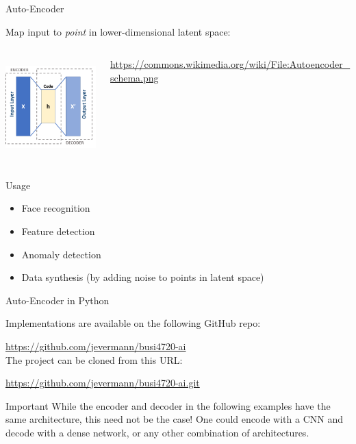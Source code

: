\documentclass[ignorenonframetext,xcolor=x11names]{beamer}
\begin{document}
\begin{frame}{Auto-Encoder}

Map input to \emph{point} in lower-dimensional latent space:

\begin{columns}
\begin{column}{.5\textwidth}
\begin{center}
\includegraphics[height=1.5in]{Autoencoder_schema.png}
\end{center}
\end{column}
\begin{column}{.4\textwidth}
\scriptsize \url{https://commons.wikimedia.org/wiki/File:Autoencoder_schema.png} \normalsize
\end{column}
\end{columns}

\begin{block}{Usage}
\begin{itemize}
   \item Face recognition
   \item Feature detection
   \item Anomaly detection
   \item Data synthesis (by adding noise to points in latent space)
\end{itemize}
\end{block}
\end{frame}
   

\begin{frame}{Auto-Encoder in Python}

Implementations are available on the following GitHub repo:

\url{https://github.com/jevermann/busi4720-ai} \\


The project can be cloned from this URL:

\url{https://github.com/jevermann/busi4720-ai.git}

\begin{block}{Important}
While the encoder and decoder in the following examples have the same architecture, this need not be the case! One could encode with a CNN and decode with a dense network, or any other combination of architectures.
\end{block}

\end{frame}
\end{document}

